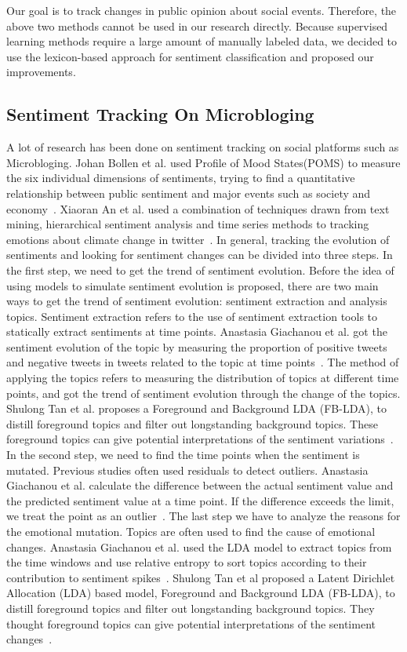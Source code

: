 \documentclass[runningheads]{llncs}
\begin{document}
Our goal is to track changes in public opinion about social events. Therefore, the above two methods cannot be used in our research directly. Because supervised learning methods require a large amount of manually labeled data, we decided to use the lexicon-based approach for sentiment classification and proposed our improvements.
\subsection{Sentiment Tracking On Microbloging}
A lot of research has been done on sentiment tracking on social platforms such as Microbloging. Johan Bollen et al. used Profile of Mood States(POMS) to measure the six individual dimensions of sentiments, trying to find a quantitative relationship between public sentiment and major events such as society and economy~\cite{Bollen2011sentimentchange}. Xiaoran An et al. used a combination of techniques drawn from text mining, hierarchical sentiment analysis and time series methods to tracking emotions about climate change in twitter~\cite{An2014sentimentchange}. In general, tracking the evolution of sentiments and looking for sentiment changes can be divided into three steps. In the first step, we need to get the trend of sentiment evolution. Before the idea of using models to simulate sentiment evolution is proposed, there are two main ways to get the trend of sentiment evolution: sentiment extraction and analysis topics. Sentiment extraction refers to the use of sentiment extraction tools to statically extract sentiments at time points. Anastasia Giachanou et al. got the sentiment evolution of the topic by measuring the proportion of positive tweets and negative tweets in tweets related to the topic at time points~\cite{Giachanou2016sentitime}. The method of applying the topics refers to measuring the distribution of topics at different time points, and got the trend of sentiment evolution through the change of the topics. Shulong Tan et al. proposes a Foreground and Background LDA (FB-LDA), to distill foreground topics and filter out longstanding background topics. These foreground topics can give potential interpretations of the sentiment variations~\cite{Tan2014topic}. In the second step, we need to find the time points when the sentiment is mutated. Previous studies often used residuals to detect outliers. Anastasia Giachanou et al. calculate the difference between the actual sentiment value and the predicted sentiment value at a time point. If the difference exceeds the limit, we treat the point as an outlier~\cite{Giachanou2016sentitime}. The last step we have to analyze the reasons for the emotional mutation. Topics are often used to find the cause of emotional changes. Anastasia Giachanou et al. used the LDA model to extract topics from the time windows and use relative entropy to sort topics according to their contribution to sentiment spikes~\cite{Giachanou2016sentichange}. Shulong Tan et al proposed a Latent Dirichlet Allocation (LDA) based model, Foreground and Background LDA (FB-LDA), to distill foreground topics and filter out longstanding background topics. They thought foreground topics can give potential interpretations of the sentiment changes~\cite{Tan2014topic}.
\end{document}
